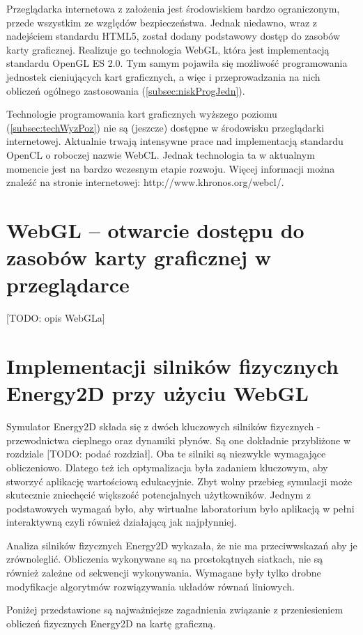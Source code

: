 Przeglądarka internetowa z założenia jest środowiskiem bardzo ograniczonym,
przede wszystkim ze względów bezpieczeństwa. Jednak niedawno, wraz z nadejściem
standardu HTML5, został dodany podstawowy dostęp do zasobów karty graficznej.
Realizuje go technologia WebGL, która jest implementacją standardu OpenGL ES
2.0. Tym samym pojawiła się możliwość programowania jednostek cieniujących kart
graficznych, a więc i przeprowadzania na nich obliczeń ogólnego zastosowania
(\ref{subsec:niskProgJedn}).

Technologie programowania kart graficznych wyższego poziomu
(\ref{subsec:techWyzPoz}) nie są (jeszcze) dostępne w środowisku przeglądarki
internetowej. Aktualnie trwają intensywne prace nad implementacją standardu
OpenCL o roboczej nazwie WebCL. Jednak technologia ta w aktualnym momencie jest
na bardzo wczesnym etapie rozwoju. Więcej informacji można znaleźć na stronie
internetowej: http://www.khronos.org/webcl/.


\section{WebGL -- otwarcie dostępu do zasobów karty graficznej w przeglądarce}

[TODO: opis WebGLa]

\section{Implementacji silników fizycznych Energy2D przy użyciu WebGL}

Symulator Energy2D składa się z dwóch kluczowych silników fizycznych -
przewodnictwa cieplnego oraz dynamiki płynów. Są one dokładnie przybliżone w
rozdziale [TODO: podać rozdział]. Oba te silniki są niezwykle wymagające
obliczeniowo. Dlatego też ich optymalizacja była zadaniem kluczowym, aby
stworzyć aplikację wartościową edukacyjnie. Zbyt wolny przebieg symulacji może
skutecznie zniechęcić większość potencjalnych użytkowników. Jednym z
podstawowych wymagań było, aby wirtualne laboratorium było aplikacją w pełni
interaktywną czyli również działającą jak najpłynniej.

Analiza silników fizycznych Energy2D wykazała, że nie ma przeciwwskazań aby je
zrównoleglić. Obliczenia wykonywane są na prostokątnych siatkach, nie są również
zależne od sekwencji wykonywania. Wymagane były tylko drobne modyfikacje
algorytmów rozwiązywania układów równań liniowych.

Poniżej przedstawione są najważniejsze zagadnienia związanie z przeniesieniem
obliczeń fizycznych Energy2D na kartę graficzną.

